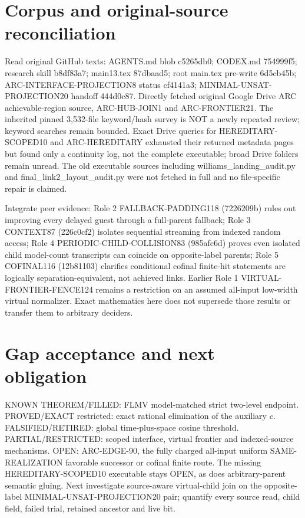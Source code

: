 \documentclass[11pt]{article}
\begin{document}
\section{Corpus and original-source reconciliation}
Read original GitHub texts: AGENTS.md blob c5265db0; CODEX.md 754999f5; research skill b8df83a7; main13.tex 87dbaad5; root main.tex pre-write 6d5cb45b; ARC-INTERFACE-PROJECTION8 status cf4141a3; MINIMAL-UNSAT-PROJECTION20 handoff 444d0c87. Directly fetched original Google Drive ARC achievable-region source, ARC-HUB-JOIN1 and ARC-FRONTIER21. The inherited pinned 3,532-file keyword/hash survey is NOT a newly repeated review; keyword searches remain bounded. Exact Drive queries for HEREDITARY-SCOPED10 and ARC-HEREDITARY exhausted their returned metadata pages but found only a continuity log, not the complete executable; broad Drive folders remain unread. The old executable sources including williams_landing_audit.py and final_link2_layout_audit.py were not fetched in full and no file-specific repair is claimed.

Integrate peer evidence: Role 2 FALLBACK-PADDING118 (7226209b) rules out improving every delayed guest through a full-parent fallback; Role 3 CONTEXT87 (226c0cf2) isolates sequential streaming from indexed random access; Role 4 PERIODIC-CHILD-COLLISION83 (985afc6d) proves even isolated child model-count transcripts can coincide on opposite-label parents; Role 5 COFINAL116 (12b81103) clarifies conditional cofinal finite-hit statements are logically separation-equivalent, not achieved links. Earlier Role 1 VIRTUAL-FRONTIER-FENCE124 remains a restriction on an assumed all-input low-width virtual normalizer. Exact mathematics here does not supersede those results or transfer them to arbitrary deciders.

\section{Gap acceptance and next obligation}
KNOWN THEOREM/FILLED: FLMV model-matched strict two-level endpoint. PROVED/EXACT restricted: exact rational elimination of the auxiliary $c$. FALSIFIED/RETIRED: global time-plus-space cosine threshold. PARTIAL/RESTRICTED: scoped interface, virtual frontier and indexed-source mechanisms. OPEN: ARC-EDGE-90, the fully charged all-input uniform SAME-REALIZATION favorable successor or cofinal finite route. The missing HEREDITARY-SCOPED10 executable stays OPEN, as does arbitrary-parent semantic gluing. Next investigate source-aware virtual-child join on the opposite-label MINIMAL-UNSAT-PROJECTION20 pair; quantify every source read, child field, failed trial, retained ancestor and live bit.
\end{document}
